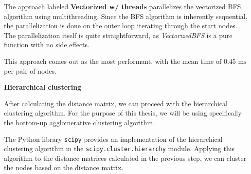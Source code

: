The approach labeled \textbf{Vectorized w/ threads} parallelizes the vectorized BFS algorithm using multithreading.
Since the BFS algorithm is inherently sequential, the parallelization is done on the outer loop iterating through the start nodes.
The parallelization itself is quite straightforward, as \textit{VectorizedBFS} is a pure function with no side effects.

This approach comes out as the most performant, with the mean time of $0.45\text{ ms}$ per pair of nodes.

\textbf{Hierarchical clustering}

After calculating the distance matrix, we can proceed with the hierarchical clustering algorithm.
For the purpose of this thesis, we will be using specifically the bottom-up agglomerative clustering algorithm.

The Python library \texttt{scipy} provides an implementation of the hierarchical clustering algorithm in the \texttt{scipy.cluster.hierarchy} module.
Applying this algorithm to the distance matrices calculated in the previous step, we can cluster the nodes based on the distance matrix.
